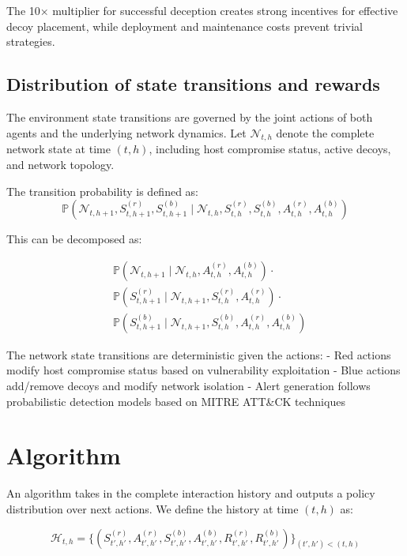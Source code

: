 \documentclass[11pt]{article}
\theoremstyle{definition}
\theoremstyle{plain}
\newcommand{\PP}{\mathbb{P}}
\begin{document}
The 10× multiplier for successful deception creates strong incentives for effective decoy placement, while deployment and maintenance costs prevent trivial strategies.

\subsection{Distribution of state transitions and rewards}

The environment state transitions are governed by the joint actions of both agents and the underlying network dynamics. Let $\mathcal{N}_{t,h}$ denote the complete network state at time $(t,h)$, including host compromise status, active decoys, and network topology.

The transition probability is defined as:
\begin{equation}
\PP(\mathcal{N}_{t,h+1}, S_{t,h+1}^{(r)}, S_{t,h+1}^{(b)} \mid \mathcal{N}_{t,h}, S_{t,h}^{(r)}, S_{t,h}^{(b)}, A_{t,h}^{(r)}, A_{t,h}^{(b)})
\end{equation}

This can be decomposed as:

\begin{align}
&\PP(\mathcal{N}_{t,h+1} \mid \mathcal{N}_{t,h}, A_{t,h}^{(r)}, A_{t,h}^{(b)}) \cdot \\
&\PP(S_{t,h+1}^{(r)} \mid \mathcal{N}_{t,h+1}, S_{t,h}^{(r)}, A_{t,h}^{(r)}) \cdot \\
&\PP(S_{t,h+1}^{(b)} \mid \mathcal{N}_{t,h+1}, S_{t,h}^{(b)}, A_{t,h}^{(r)}, A_{t,h}^{(b)})
\end{align}

The network state transitions are deterministic given the actions:
- Red actions modify host compromise status based on vulnerability exploitation
- Blue actions add/remove decoys and modify network isolation
- Alert generation follows probabilistic detection models based on MITRE ATT\&CK techniques

\section{Algorithm}

An algorithm takes in the complete interaction history and outputs a policy distribution over next actions. We define the history at time $(t,h)$ as:

\begin{equation}
\mathcal{H}_{t,h} = \{(S_{t',h'}^{(r)}, A_{t',h'}^{(r)}, S_{t',h'}^{(b)}, A_{t',h'}^{(b)}, R_{t',h'}^{(r)}, R_{t',h'}^{(b)})\}_{(t',h') < (t,h)}
\end{equation}
\end{document}
